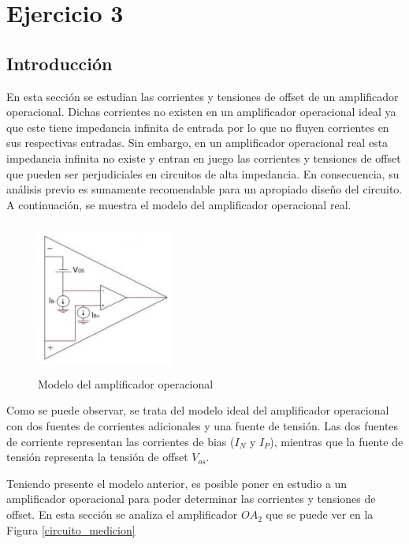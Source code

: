 
\section{Ejercicio 3}
\subsection{Introducción}

En esta sección se estudian las corrientes y tensiones de offset de un amplificador operacional. Dichas corrientes no existen en un amplificador operacional
ideal ya que este tiene impedancia infinita de entrada por lo que no fluyen corrientes en sus respectivas entradas. Sin embargo, en un amplificador operacional real 
esta impedancia infinita no existe y entran en juego las corrientes y tensiones de offset que pueden ser perjudiciales en circuitos de alta impedancia. En consecuencia, su análisis previo es sumamente recomendable para un apropiado diseño del
circuito. A continuación, se muestra el modelo del amplificador operacional real.

\begin{figure}[ht]                                                       
    \centering\includegraphics[width=0.4\textwidth, height=5cm]{../Ex3/Figuras/fig_0.png}
     \caption{Modelo del amplificador operacional}
     \label{fig_0}
     \end{figure}


Como se puede observar, se trata del modelo ideal del amplificador operacional con dos fuentes de corrientes adicionales y una fuente de tensión.
Las dos fuentes de corriente representan las corrientes de bias ($I_N$ y $I_P$), mientras que la fuente de tensión representa la tensión de offset $V_{os}$.

Teniendo presente el modelo anterior, es posible poner en estudio a un amplificador operacional para poder determinar las corrientes y tensiones de offset. En esta sección se analiza el
amplificador $OA_2$ que se puede ver en la Figura \ref{circuito_medicion}



